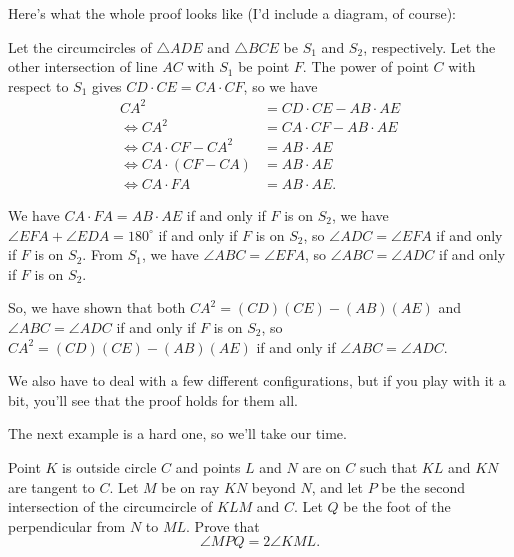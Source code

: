 Here's what the whole proof looks like (I'd include a diagram, of course):

Let the circumcircles of $\triangle ADE$ and $\triangle BCE$ be $S_1$ and $S_2$, respectively. Let the other intersection of line $AC$ with $S_1$ be point $F.$ The power of point $C$ with respect to $S_1$ gives $CD \cdot CE = CA \cdot CF$, so we have
\begin{align*} CA^2 &= CD \cdot CE - AB \cdot AE\\ \iff CA^2 &= CA \cdot CF - AB \cdot AE \\ \iff CA \cdot CF -CA^2&= AB \cdot AE\\ \iff CA \cdot (CF-CA) &=AB \cdot AE\\ \iff CA \cdot FA &=AB \cdot AE . \end{align*}

We have $CA \cdot FA = AB \cdot AE$ if and only if $F$ is on $S_2$, we have $\angle EFA + \angle EDA =180^\circ$ if and only if $F$ is on $S_2$, so $\angle ADC = \angle EFA$ if and only if $F$ is on $S_2.$ From $S_1$, we have $\angle ABC = \angle EFA$, so $\angle ABC = \angle ADC$ if and only if $F$ is on $S_2$.

So, we have shown that both $CA^2 = (CD)(CE) - (AB)(AE)$ and $\angle ABC = \angle ADC$ if and only if $F$ is on $S_2$, so $CA^2 = (CD)(CE) - (AB)(AE)$ if and only if $\angle ABC = \angle ADC$.

We also have to deal with a few different configurations, but if you play with it a bit, you'll see that the proof holds for them all.

The next example is a hard one, so we'll take our time.

Point $K$ is outside circle $C$ and points $L$ and $N$ are on $C$ such that $KL$ and $KN$ are tangent to $C.$ Let $M$ be on ray $KN$ beyond $N$, and let $P$ be the second intersection of the circumcircle of $KLM$ and $C$. Let $Q$ be the foot of the perpendicular from $N$ to $ML$. Prove that $$ \angle MPQ = 2\angle KML. $$



